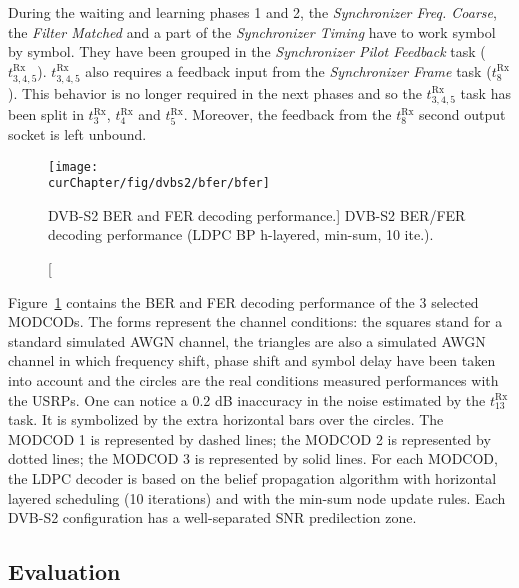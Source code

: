 During the waiting and learning phases 1 and 2, the \emph{Synchronizer Freq.
Coarse}, the \emph{Filter Matched} and a part of the \emph{Synchronizer Timing}
have to work symbol by symbol. They have been grouped in the \emph{Synchronizer
Pilot Feedback} task ($t^\text{Rx}_{3,4,5}$). $t^\text{Rx}_{3,4,5}$ also
requires a feedback input from the \emph{Synchronizer Frame} task
($t^\text{Rx}_8$). This behavior is no longer required in the next phases and so
the $t^\text{Rx}_{3,4,5}$ task has been split in $t^\text{Rx}_3$,
$t^\text{Rx}_4$ and $t^\text{Rx}_5$. Moreover, the feedback from the
$t^\text{Rx}_8$ second output socket is left unbound.

\begin{figure}[htp]
  \centering
  \texttt{[image: \\curChapter/fig/dvbs2/bfer/bfer]}
  \caption
    [DVB-S2 BER and FER decoding performance.]
    {DVB-S2 BER/FER decoding performance (LDPC BP h-layered, min-sum, 10 ite.).}
  \label{fig:dvbs2_bfer}
\end{figure}

Figure~\ref{fig:dvbs2_bfer} contains the BER and FER decoding performance of the
3 selected MODCODs. The forms represent the channel conditions: the squares
stand for a standard simulated AWGN channel, the triangles are also a simulated
AWGN channel in which frequency shift, phase shift and symbol delay have been
taken into account and the circles are the real conditions measured performances
with the USRPs. One can notice a 0.2 dB inaccuracy in the noise estimated by the
$t^\text{Rx}_{13}$ task. It is symbolized by the extra horizontal bars over
the circles. The {\color{Paired-1} MODCOD 1} is represented by dashed lines; the
{\color{Paired-3} MODCOD 2} is represented by dotted lines; the
{\color{Paired-5} MODCOD 3} is represented by solid lines. For each MODCOD, the
LDPC decoder is based on the belief propagation algorithm with horizontal
layered scheduling (10 iterations) and with the min-sum node update rules. Each
DVB-S2 configuration has a well-separated SNR predilection zone.

\subsection{Evaluation}

